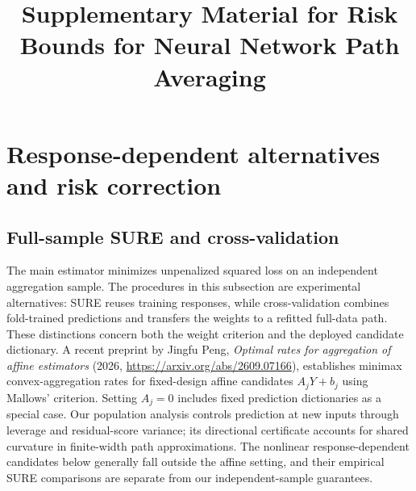 \documentclass[pdflatex,sn-mathphys-ay]{sn-jnl}
\theoremstyle{remark}\newtheorem{remark}[theorem]{Remark}
\begin{document}
\title{Supplementary Material for Risk Bounds for Neural Network Path Averaging}
\author*[1]{ }
\maketitle
\renewcommand{\thesection}{S\arabic{section}}
\renewcommand{\thetable}{S\arabic{table}}
\renewcommand{\theequation}{S\arabic{equation}}
\section{Response-dependent alternatives and risk correction}\label{app:correction}
\subsection{Full-sample SURE and cross-validation}
The main estimator minimizes unpenalized squared loss on an independent aggregation sample. The procedures in this subsection are experimental alternatives: SURE reuses training responses, while cross-validation combines fold-trained predictions and transfers the weights to a refitted full-data path. These distinctions concern both the weight criterion and the deployed candidate dictionary.
A recent preprint by Jingfu Peng, \emph{Optimal rates for aggregation of affine estimators} (2026, \url{https://arxiv.org/abs/2609.07166}), establishes minimax convex-aggregation rates for fixed-design affine candidates $A_jY+b_j$ using Mallows' criterion. Setting $A_j=0$ includes fixed prediction dictionaries as a special case. Our population analysis controls prediction at new inputs through leverage and residual-score variance; its directional certificate accounts for shared curvature in finite-width path approximations. The nonlinear response-dependent candidates below generally fall outside the affine setting, and their empirical SURE comparisons are separate from our independent-sample guarantees.
\end{document}
